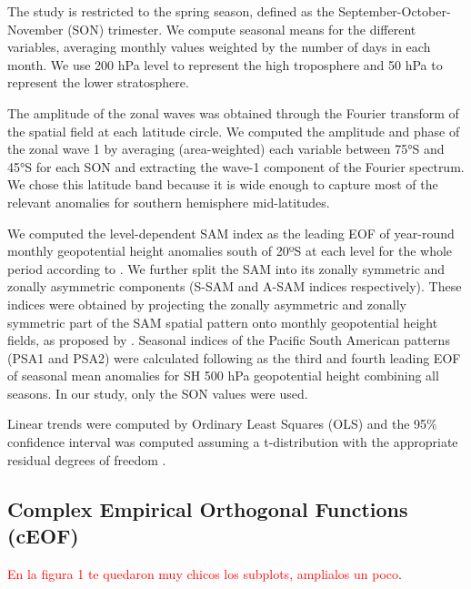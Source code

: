 \documentclass[smallextended]{svjour3}       %
\begin{document}
The study is restricted to the spring season, defined as the September-October-November (SON) trimester.
We compute seasonal means for the different variables, averaging monthly values weighted by the number of days in each month.
We use 200 hPa level to represent the high troposphere and 50 hPa to represent the lower stratosphere.

The amplitude of the zonal waves was obtained through the Fourier transform of the spatial field at each latitude circle.
We computed the amplitude and phase of the zonal wave 1 by averaging (area-weighted) each variable between 75°S and 45°S for each SON and extracting the wave-1 component of the Fourier spectrum.
We chose this latitude band because it is wide enough to capture most of the relevant anomalies for southern hemisphere mid-latitudes.

We computed the level-dependent SAM index as the leading EOF of year-round monthly geopotential height anomalies south of 20ºS at each level for the whole period according to \citet{baldwin2009}.
We further split the SAM into its zonally symmetric and zonally asymmetric components (S-SAM and A-SAM indices respectively).
These indices were obtained by projecting the zonally asymmetric and zonally symmetric part of the SAM spatial pattern onto monthly geopotential height fields, as proposed by \citet{campitelli2021}.
Seasonal indices of the Pacific South American patterns (PSA1 and PSA2) were calculated following \citet{mo2001} as the third and fourth leading EOF of seasonal mean anomalies for SH 500 hPa geopotential height combining all seasons.
In our study, only the SON values were used.

Linear trends were computed by Ordinary Least Squares (OLS) and the 95\% confidence interval was computed assuming a t-distribution with the appropriate residual degrees of freedom \citep{wilks2011r}.

\hypertarget{complex-empirical-orthogonal-functions-ceof}{%
\subsection{Complex Empirical Orthogonal Functions (cEOF)}\label{complex-empirical-orthogonal-functions-ceof}}



\textcolor{red}{En la figura 1 te quedaron muy chicos los subplots, amplialos un poco}.
\end{document}

